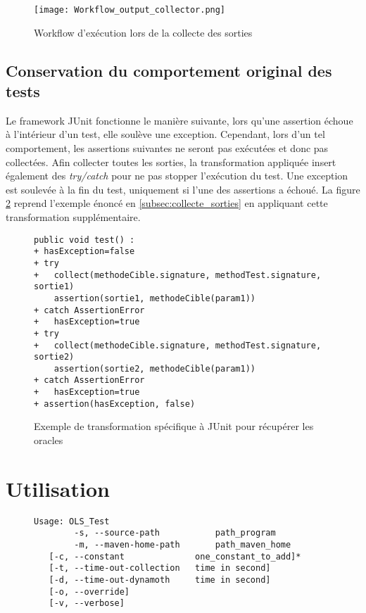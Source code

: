 \begin{figure}[H]
\begin{center}
\texttt{[image: Workflow\_output\_collector.png]}
\end{center}
\caption{Workflow d'exécution lors de la collecte des sorties}
\label{fig:workflow_collectes_sorties}
\end{figure}

\subsection{Conservation du comportement original des tests}

\par Le framework JUnit fonctionne le manière suivante, lors qu'une assertion échoue à l'intérieur d'un test, elle soulève une exception. Cependant, lors d'un tel comportement, les assertions suivantes ne seront pas exécutées et donc pas collectées. Afin collecter toutes les sorties, la transformation appliquée insert également des \textit{try/catch} pour ne pas stopper l'exécution du test. Une exception est soulevée à la fin du test, uniquement si l'une des assertions a échoué. La figure \ref{fig:collect_sorties_try_catch} reprend l'exemple énoncé en \ref{subsec:collecte_sorties} en appliquant cette transformation supplémentaire.

\begin{figure}[H]
\begin{lstlisting}
public void test() :
+ hasException=false
+ try
+   collect(methodeCible.signature, methodTest.signature, sortie1)
    assertion(sortie1, methodeCible(param1))
+ catch AssertionError
+   hasException=true
+ try
+   collect(methodeCible.signature, methodTest.signature, sortie2)
    assertion(sortie2, methodeCible(param1))
+ catch AssertionError
+   hasException=true
+ assertion(hasException, false)
\end{lstlisting}
\caption{Exemple de transformation spécifique à JUnit pour récupérer les oracles}
\label{fig:collect_sorties_try_catch}
\end{figure}






\section{Utilisation}

\begin{figure}[H]

\begin{verbatim}
Usage: OLS_Test
	    -s, --source-path           path_program
	    -m, --maven-home-path       path_maven_home
   [-c, --constant              one_constant_to_add]*
   [-t, --time-out-collection   time in second]
   [-d, --time-out-dynamoth     time in second]
   [-o, --override]
   [-v, --verbose]
\end{verbatim}

\end{figure}
	

	
		
		
		
